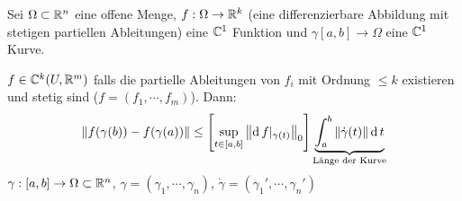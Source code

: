 \begin{Sat}
  Sei $\Omega\subset\mathbb{R}^n$ eine offene Menge, $f:\Omega\rightarrow\mathbb{R}^k$ (eine differenzierbare Abbildung mit stetigen partiellen Ableitungen) eine $\mathbb{C}^1$ Funktion und $\gamma [a,b]\to\Omega$ eine $\mathbb{C}^1$ Kurve.
\end{Sat}
\begin{Def}
  $f\in\mathbb{C}^k(U,\mathbb{R}^m)$ falls die partielle Ableitungen von $f_i$ mit Ordnung $\leq k$ existieren und stetig sind ($f=(f_1,\cdots,f_m)$). Dann:
  \[\left\| f(\gamma(b))-f(\gamma(a)) \right\|\leq \left[ \sup_{t\in [a,b]}\left\| \operatorname{d} f|_{\gamma(t)} \right\|_0 \right]\underbrace{\int_a^b\left\| \dot \gamma(t) \right\|\operatorname{d} t}_{\text{Länge der Kurve}}\]
  $\gamma:[a,b]\rightarrow\Omega\subset\mathbb{R}^n$, $\gamma=(\gamma_1,\cdots,\gamma_n)$, $\dot\gamma=(\gamma_1',\cdots,\gamma_n')$
\end{Def}
